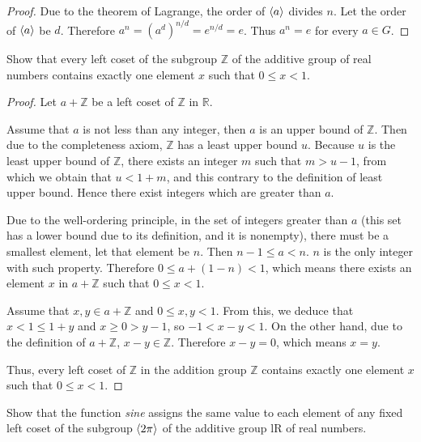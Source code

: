 \begin{proof}
    Due to the theorem of Lagrange, the order of $\left\langle{a}\right\rangle$ divides $n$. Let the order of $\left\langle{a}\right\rangle$ be $d$. Therefore $a^{n} = {(a^{d})}^{n/d} = e^{n/d} = e$. Thus $a^{n} = e$ for every $a\in G$.
\end{proof}

\begin{exercise}
    Show that every left coset of the subgroup $\mathbb{Z}$ of the additive group of real numbers contains exactly one element $x$ such that $0\leq x < 1$.
\end{exercise}

\begin{proof}
    Let $a + \mathbb{Z}$ be a left coset of $\mathbb{Z}$ in $\mathbb{R}$.

    Assume that $a$ is not less than any integer, then $a$ is an upper bound of $\mathbb{Z}$. Then due to the completeness axiom, $\mathbb{Z}$ has a least upper bound $u$. Because $u$ is the least upper bound of $\mathbb{Z}$, there exists an integer $m$ such that $m > u - 1$, from which we obtain that $u < 1 + m$, and this contrary to the definition of least upper bound. Hence there exist integers which are greater than $a$.

    Due to the well-ordering principle, in the set of integers greater than $a$ (this set has a lower bound due to its definition, and it is nonempty), there must be a smallest element, let that element be $n$. Then $n - 1\leq a < n$. $n$ is the only integer with such property. Therefore $0\leq a + (1 - n) < 1$, which means there exists an element $x$ in $a + \mathbb{Z}$ such that $0\leq x < 1$.

    Assume that $x, y\in a + \mathbb{Z}$ and $0\leq x, y < 1$. From this, we deduce that $x < 1 \leq 1 + y$ and $x\ge 0 > y - 1$, so $-1 < x - y < 1$. On the other hand, due to the definition of $a + \mathbb{Z}$, $x - y\in\mathbb{Z}$. Therefore $x - y = 0$, which means $x = y$.

    Thus, every left coset of $\mathbb{Z}$ in the addition group $\mathbb{Z}$ contains exactly one element $x$ such that $0\leq x < 1$.
\end{proof}

\begin{exercise}
    Show that the function \textit{sine} assigns the same value to each element of any fixed left coset of the subgroup $\left\langle{2\pi}\right\rangle$ of the additive group lR of real numbers.
\end{exercise}

